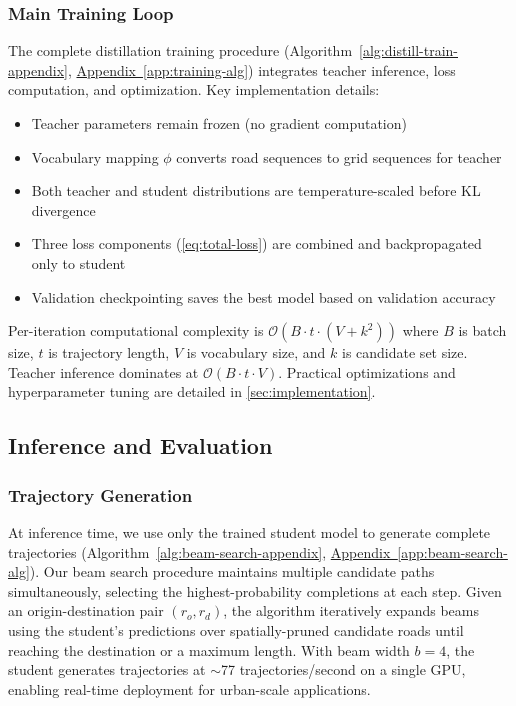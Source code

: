 \subsubsection{Main Training Loop}
The complete distillation training procedure (Algorithm~\ref{alg:distill-train-appendix}, \hyperref[app:training-alg]{Appendix~\ref*{app:training-alg}}) integrates teacher inference, loss computation, and optimization. Key implementation details:

\begin{itemize}[noitemsep,topsep=0pt]
\item Teacher parameters remain frozen (no gradient computation)
\item Vocabulary mapping $\phi$ converts road sequences to grid sequences for teacher
\item Both teacher and student distributions are temperature-scaled before KL divergence
\item Three loss components (\autoref{eq:total-loss}) are combined and backpropagated only to student
\item Validation checkpointing saves the best model based on validation accuracy
\end{itemize}

Per-iteration computational complexity is $\mathcal{O}(B \cdot t \cdot (V + k^2))$ where $B$ is batch size, $t$ is trajectory length, $V$ is vocabulary size, and $k$ is candidate set size. Teacher inference dominates at $\mathcal{O}(B \cdot t \cdot V)$. Practical optimizations and hyperparameter tuning are detailed in \autoref{sec:implementation}.

\subsection{Inference and Evaluation}
\label{sec:method-inference}

\subsubsection{Trajectory Generation}
At inference time, we use only the trained student model to generate complete trajectories (Algorithm~\ref{alg:beam-search-appendix}, \hyperref[app:beam-search-alg]{Appendix~\ref*{app:beam-search-alg}}). Our beam search procedure maintains multiple candidate paths simultaneously, selecting the highest-probability completions at each step. Given an origin-destination pair $(r_o, r_d)$, the algorithm iteratively expands beams using the student's predictions over spatially-pruned candidate roads until reaching the destination or a maximum length. With beam width $b=4$, the student generates trajectories at $\sim$77 trajectories/second on a single GPU, enabling real-time deployment for urban-scale applications.

